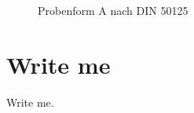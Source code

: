 \documentclass{article}
\begin{document}

% 


\begin{figure}
\centering
\small
\def\svgwidth{\textwidth}

\caption{Probenform A nach DIN 50125}
\label{fig:zugprobeA}
\end{figure}

\section{Write me}
\label{sec:write-me}
Write me.~\cite{www:pdflatex-makefile}


% 
\end{document}
